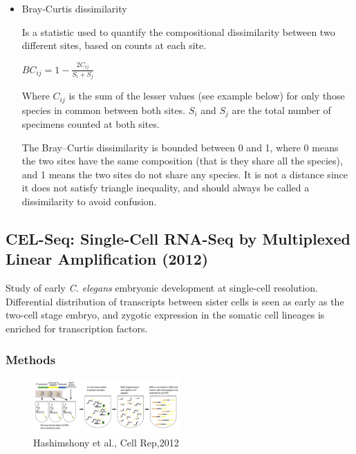 \begin{itemize}
\item
  Bray-Curtis dissimilarity

  Is a statistic used to quantify the compositional dissimilarity
  between two different sites, based on counts at each site.

  \(BC_{ij}=1-\frac{2C_{ij}}{S_i+S_j}\)

  Where \(C_{ij}\) is the sum of the lesser values (see example below)
  for only those species in common between both sites. \(S_i\) and
  \(S_j\) are the total number of specimens counted at both sites.

  The Bray--Curtis dissimilarity is bounded between 0 and 1, where 0
  means the two sites have the same composition (that is they share all
  the species), and 1 means the two sites do not share any species. It
  is not a distance since it does not satisfy triangle inequality, and
  should always be called a dissimilarity to avoid confusion.
\end{itemize}

\hypertarget{cel-seq-single-cell-rna-seq-by-multiplexed-linear-amplification-2012}{%
\subsection{CEL-Seq: Single-Cell RNA-Seq by Multiplexed Linear
Amplification
(2012)}\label{cel-seq-single-cell-rna-seq-by-multiplexed-linear-amplification-2012}}

Study of early \emph{C. elegans} embryonic development at single-cell
resolution. Differential distribution of transcripts between sister
cells is seen as early as the two-cell stage embryo, and zygotic
expression in the somatic cell lineages is enriched for transcription
factors.

\hypertarget{methods-1}{%
\subsubsection{Methods}\label{methods-1}}

\begin{figure}
\centering
\includegraphics[width=0.5\textwidth]{images/Screen_Shot_2023-02-21_at_13-19-47.png}
\caption{Hashimshony  et al., Cell Rep,2012}
\end{figure}

